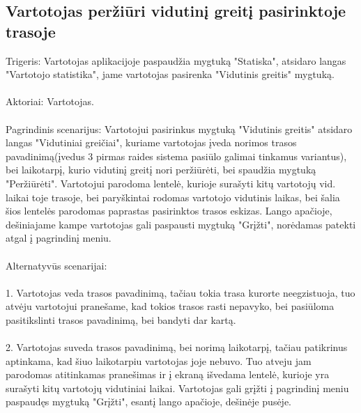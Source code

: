 \documentclass[oneside]{VUMIFPSkursinis}
\begin{document}
\subsection{Vartotojas peržiūri vidutinį greitį pasirinktoje trasoje}
Trigeris: Vartotojas aplikacijoje paspaudžia mygtuką "Statiska", atsidaro langas "Vartotojo statistika", jame vartotojas pasirenka "Vidutinis greitis" mygtuką. \\ \\
Aktoriai: Vartotojas. \\ \\ 
Pagrindinis scenarijus: Vartotojui pasirinkus mygtuką "Vidutinis greitis" atsidaro langas "Vidutiniai greičiai", kuriame vartotojas įveda norimos trasos pavadinimą(įvedus 3 pirmas raides sistema pasiūlo galimai tinkamus variantus), bei laikotarpį, kurio vidutinį greitį nori peržiūrėti, bei spaudžia mygtuką "Peržiūrėti". Vartotojui parodoma lentelė, kurioje surašyti kitų vartotojų vid. laikai toje trasoje, bei paryškintai rodomas vartotojo vidutinis laikas, bei šalia šios lentelės parodomas paprastas pasirinktos trasos eskizas. Lango apačioje, dešiniajame kampe vartotojas gali paspausti mygtuką "Grįžti", norėdamas patekti atgal į pagrindinį meniu. \\ \\
Alternatyvūs scenarijai: \\ \\
1. Vartotojas veda trasos pavadinimą, tačiau tokia trasa kurorte neegzistuoja, tuo atvėju vartotojui pranešame, kad tokios trasos rasti nepavyko, bei pasiūloma pasitikslinti trasos pavadinimą, bei bandyti dar kartą. \\ \\
2. Vartotojas suveda trasos pavadinimą, bei norimą laikotarpį, tačiau patikrinus aptinkama, kad šiuo laikotarpiu vartotojas joje nebuvo. Tuo atveju jam parodomas atitinkamas pranešimas ir į ekraną išvedama lentelė, kurioje yra surašyti kitų vartotojų vidutiniai laikai. Vartotojas gali grįžti į pagrindinį meniu paspaudęs mygtuką "Grįžti", esantį lango apačioje, dešinėje pusėje. \\ \\
\end{document}
